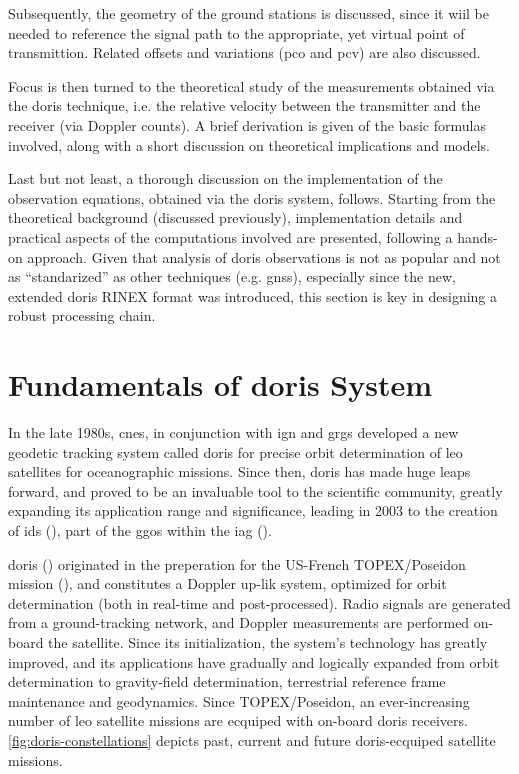 Subsequently, the geometry of the ground stations is discussed, since it wiil be needed 
to reference the signal path to the appropriate, yet virtual point of transmittion. 
Related offsets and variations (\gls{pco} and \gls{pcv}) are also discussed.

Focus is then turned to the theoretical study of the measurements obtained via the 
\gls{doris} technique, i.e. the relative velocity between the transmitter and the 
receiver (via Doppler counts). A brief derivation is given of the basic formulas 
involved, along with a short discussion on theoretical implications and models.

Last but not least, a thorough discussion on the implementation of the observation 
equations, obtained via the \gls{doris} system, follows. Starting from the theoretical 
background (discussed previously), implementation details and practical aspects of the 
computations involved are presented, following a hands-on approach. Given that analysis 
of \gls{doris} observations is not as popular and not as ``standarized'' as other 
techniques (e.g. \gls{gnss}), especially since the new, extended \gls{doris} RINEX 
format was introduced, this section is key in designing a robust processing chain.

\section{Fundamentals of \gls{doris} System}\label{sec:doris-system-fundamentals}
In the late 1980s, \gls{cnes}, in conjunction with \gls{ign} and \gls{grgs} developed 
a new geodetic tracking system called \gls{doris} for precise orbit determination 
of \gls{leo} satellites for oceanographic missions. Since then, \gls{doris} has 
made huge leaps forward, and proved to be an invaluable tool to the scientific community, 
greatly expanding its application range and significance, 
leading in 2003 to the creation of \gls{ids} (\cite{Willis2016}), 
part of the \gls{ggos} within the \gls{iag} (\cite{Willis2006}). 

\gls{doris} (\cite{Barlier2005}) originated in the preperation for the US-French 
TOPEX/Poseidon mission (\cite{Fu1994}), 
and constitutes a Doppler up-lik system, optimized for orbit determination (both 
in real-time and post-processed). Radio signals are generated from a ground-tracking 
network, and Doppler measurements are performed on-board the satellite. Since its 
initialization, the system's technology has greatly improved, and its applications 
have gradually and logically expanded from orbit determination to gravity-field 
determination, terrestrial reference frame maintenance and geodynamics. Since TOPEX/Poseidon, an 
ever-increasing number of \gls{leo} satellite missions are ecquiped with on-board 
\gls{doris} receivers. \autoref{fig:doris-constellations} depicts past, current and 
future \gls{doris}-ecquiped satellite missions.

